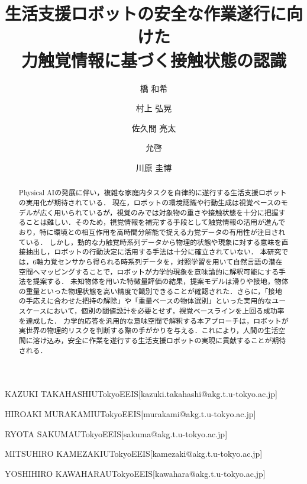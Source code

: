 \documentclass[Japanese]{dicomopapers}
\begin{document}
\title{生活支援ロボットの安全な作業遂行に向けた\\力触覚情報に基づく接触状態の認識}




\author{{}橋 和希}{KAZUKI TAKAHASHI}{UTokyoEEIS}[kazuki.takahashi@akg.t.u-tokyo.ac.jp]
\author{村上 弘晃}{HIROAKI MURAKAMI}{UTokyoEEIS}[murakami@akg.t.u-tokyo.ac.jp]
\author{佐久間 亮太}{RYOTA SAKUMA}{UTokyoEEIS}[sakuma@akg.t.u-tokyo.ac.jp]
\author{{}允啓}{MITSUHIRO KAMEZAKI}{UTokyoEEIS}[kamezaki@akg.t.u-tokyo.ac.jp]
\author{川原 圭博}{YOSHIHIRO KAWAHARA}{UTokyoEEIS}[kawahara@akg.t.u-tokyo.ac.jp]

\begin{abstract}
Physical AIの発展に伴い，複雑な家庭内タスクを自律的に遂行する生活支援ロボットの実用化が期待されている．
現在，ロボットの環境認識や行動生成は視覚ベースのモデルが広く用いられているが，視覚のみでは対象物の重さや接触状態を十分に把握することは難しい．そのため，視覚情報を補完する手段として触覚情報の活用が進んでおり，特に環境との相互作用を高時間分解能で捉える力覚データの有用性が注目されている．
しかし，動的な力触覚時系列データから物理的状態や現象に対する意味を直接抽出し，ロボットの行動決定に活用する手法は十分に確立されていない．
本研究では，6軸力覚センサから得られる時系列データを，対照学習を用いて自然言語の潜在空間へマッピングすることで，ロボットが力学的現象を意味論的に解釈可能にする手法を提案する．
未知物体を用いた特徴量評価の結果，提案モデルは滑りや接地，物体の重量といった物理状態を高い精度で識別できることが確認された．さらに，「接地の手応えに合わせた把持の解除」や「重量ベースの物体選別」といった実用的なユースケースにおいて，個別の閾値設計を必要とせず，視覚ベースラインを上回る成功率を達成した．
力学的応答を汎用的な意味空間で解釈する本アプローチは，ロボットが実世界の物理的リスクを判断する際の手がかりを与える．これにより，人間の生活空間に溶け込み，安全に作業を遂行する生活支援ロボットの実現に貢献することが期待される．
\end{abstract}


\maketitle
\end{document}
